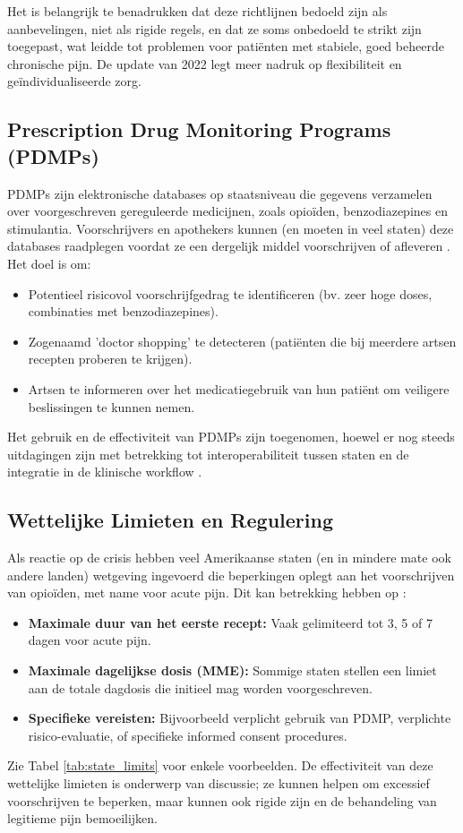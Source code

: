 \documentclass[11pt, a4paper]{report} %
\begin{document}
Het is belangrijk te benadrukken dat deze richtlijnen bedoeld zijn als aanbevelingen, niet als rigide regels, en dat ze soms onbedoeld te strikt zijn toegepast, wat leidde tot problemen voor patiënten met stabiele, goed beheerde chronische pijn. De update van 2022 legt meer nadruk op flexibiliteit en geïndividualiseerde zorg.

\subsection{Prescription Drug Monitoring Programs (PDMPs)}
PDMPs zijn elektronische databases op staatsniveau die gegevens verzamelen over voorgeschreven gereguleerde medicijnen, zoals opioïden, benzodiazepines en stimulantia. Voorschrijvers en apothekers kunnen (en moeten in veel staten) deze databases raadplegen voordat ze een dergelijk middel voorschrijven of afleveren \parencite{CDCPDMPs}. Het doel is om:
\begin{itemize}
    \item Potentieel risicovol voorschrijfgedrag te identificeren (bv. zeer hoge doses, combinaties met benzodiazepines).
    \item Zogenaamd 'doctor shopping' te detecteren (patiënten die bij meerdere artsen recepten proberen te krijgen).
    \item Artsen te informeren over het medicatiegebruik van hun patiënt om veiligere beslissingen te kunnen nemen.
\end{itemize}
Het gebruik en de effectiviteit van PDMPs zijn toegenomen, hoewel er nog steeds uitdagingen zijn met betrekking tot interoperabiliteit tussen staten en de integratie in de klinische workflow \parencite{AAFP2024OpioidDecrease}.

\subsection{Wettelijke Limieten en Regulering}
Als reactie op de crisis hebben veel Amerikaanse staten (en in mindere mate ook andere landen) wetgeving ingevoerd die beperkingen oplegt aan het voorschrijven van opioïden, met name voor acute pijn. Dit kan betrekking hebben op \parencite{BallotpediaStateLimits}:
\begin{itemize}
    \item \textbf{Maximale duur van het eerste recept:} Vaak gelimiteerd tot 3, 5 of 7 dagen voor acute pijn.
    \item \textbf{Maximale dagelijkse dosis (MME):} Sommige staten stellen een limiet aan de totale dagdosis die initieel mag worden voorgeschreven.
    \item \textbf{Specifieke vereisten:} Bijvoorbeeld verplicht gebruik van PDMP, verplichte risico-evaluatie, of specifieke informed consent procedures.
\end{itemize}
Zie Tabel \ref{tab:state_limits} voor enkele voorbeelden. De effectiviteit van deze wettelijke limieten is onderwerp van discussie; ze kunnen helpen om excessief voorschrijven te beperken, maar kunnen ook rigide zijn en de behandeling van legitieme pijn bemoeilijken.
\end{document}
